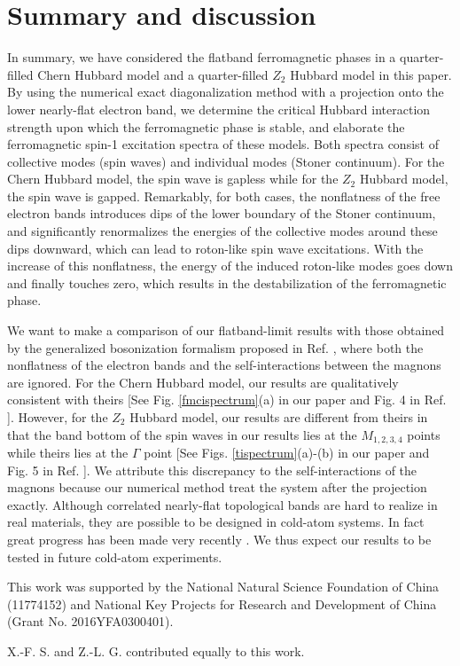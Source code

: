 \documentclass[amsmath,superscriptaddress,showpacs,aps,prb,twocolumn]{revtex4-1}
\begin{document}
\section{Summary and discussion}\label{sd}
\par In summary, we have considered the flatband ferromagnetic phases in a quarter-filled Chern Hubbard model and a quarter-filled $Z_2$ Hubbard model in this paper. By using the numerical exact diagonalization method with a projection onto the lower nearly-flat electron band, we determine the critical Hubbard interaction strength upon which the ferromagnetic phase is stable, and elaborate the ferromagnetic spin-1 excitation spectra of these models. Both spectra consist of collective modes (spin waves) and individual modes (Stoner continuum). For the Chern Hubbard model, the spin wave is gapless while for the $Z_2$ Hubbard model, the spin wave is gapped. Remarkably, for both cases, the nonflatness of the free electron bands introduces dips of the lower boundary of the Stoner continuum, and significantly renormalizes the energies of the collective modes around these dips downward, which can lead to roton-like spin wave excitations. With the increase of this nonflatness, the energy of the induced roton-like modes goes down and finally touches zero, which results in the destabilization of the ferromagnetic phase.

\par We want to make a comparison of our flatband-limit results with those obtained by the generalized bosonization formalism proposed in Ref. \cite{DG_PRB2015}, where both the nonflatness of the electron bands and the self-interactions between the magnons are ignored. For the Chern Hubbard model, our results are qualitatively consistent with theirs [See Fig. \ref{fmcispectrum}(a) in our paper and Fig. 4 in Ref. \cite{DG_PRB2015}]. However, for the $Z_2$ Hubbard model, our results are different from theirs in that the band bottom of the spin waves in our results lies at the $M_{1,2,3,4}$ points while theirs lies at the $\Gamma$ point [See Figs. \ref{tispectrum}(a)-(b) in our paper and Fig. 5 in Ref. \cite{DG_PRB2015}]. We attribute this discrepancy to the self-interactions of the magnons because our numerical method treat the system after the projection exactly. Although correlated nearly-flat topological bands are hard to realize in real materials, they are possible to be designed in cold-atom systems. In fact great progress has been made very recently \cite{LCJPS_N2009,AALBPB_PRL2013,MSKBK_PRL2013,JMDLUGE_N2014}. We thus expect our results to be tested in future cold-atom experiments.

\begin{acknowledgments}
\par This work was supported by the National Natural Science Foundation of China (11774152) and National Key Projects for Research and Development of China (Grant No. 2016YFA0300401).
\par X.-F. S. and Z.-L. G. contributed equally to this work.
\end{acknowledgments}


\end{document}
